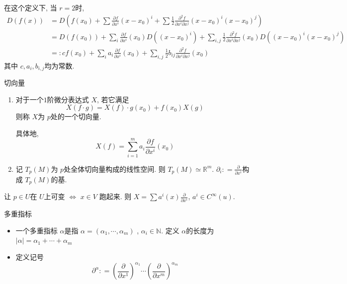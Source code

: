 \documentclass[../main.tex]{subfiles}
\begin{document}
    在这个定义下, 当 \(  r = 2 \)时, \[
  \begin{aligned}
    D\left( f\left( x \right)  \right)&= D\left( f\left( x_0 \right)+ \sum   \frac{\partial f}{\partial x^{i}}\left( x-x_0 \right)^{i}+ \sum \frac{1 }{2 } \frac{\partial ^{2}f}{\partial x^{i}\partial x^{j}  } \left( x-x_0 \right)^{i}\left( x-x_0 \right)^{j}   \right)   \\ 
     &= D\left( f\left( x_0 \right)  \right)+  \sum _{i} \frac{\partial f}{\partial x^{i}}\left( x_0 \right)D\left( \left( x-x_0 \right)^{i}  \right) + \sum _{i,j}\frac{1 }{2 }\frac{\partial ^{2}f    }{\partial x^{i} \partial x^{j}}   \left( x_0 \right)D\left( \left( x-x_0 \right)^{i}\left( x-x_0 \right)^{j}   \right)  \\ 
      &=: c f\left( x_0 \right)+ \sum _{i}a_{i}\frac{\partial f}{\partial x^{i}}\left( x_0 \right)+   \sum _{i,j}\frac{1 }{2 }b_{ij}\frac{\partial ^{2}f}{\partial x^{i} \partial x^{j}}\left( x_0 \right)   
  \end{aligned}
    \]其中 \(  c,a_{i},b_{i,j}  \)均为常数. 

    \begin{definition}{切向量}{}
       \begin{enumerate}
        \item  对于一个\(  1  \)阶微分表达式 \(  X  \), 若它满足 \[
        X\left( f\cdot g \right) =  X\left( f \right)\cdot g\left( x_0 \right)+ f\left( x_0 \right)X\left( g \right)     
        \]则称 \(  X  \)为 \(  p  \)处的一个切向量.    

        具体地,  \[
        X\left( f \right)= \sum _{i= 1}^{m}a_{i}\frac{\partial f}{\partial x^{i}}\left( x_0 \right)  
        \]
        \item 记 \(  T_{p}\left( M \right)   \)为 \(  p  \)处全体切向量构成的线性空间. 则 \(  T_{p}\left( M \right)\simeq \mathbb{R} ^{m}   \).  \(   \partial _{i}: =  \frac{\partial }{\partial x^{i}}  \)构成 \(  T_{p}\left( M \right)   \)的基.      
       \end{enumerate}
       
    \end{definition}
   
    让 \(  p \in U  \)在 \(  U  \)上可变 \(  \iff   \) \(  x \in V  \) 跑起来.   则 \(  X =  \sum a^{i}\left( x \right)\frac{\partial }{\partial x^{i}}   \), \(  a^{i} \in C^{\infty}\left( u \right)   \).   
    
    \begin{definition}{多重指标}{}
      \begin{itemize}
        \item   一个多重指标 \(  \alpha   \)是指 \(  \alpha = \left( \alpha _1 ,\cdots  , \alpha _{m} \right)   \) , \(  \alpha _{i} \in \mathbb{N}   \). 定义 \(  \alpha   \)的长度为 \(  \left| \alpha  \right|= \alpha _1 + \cdots + \alpha _{m}   \)
        \item 定义记号 \[
         \partial ^{\alpha } : =  \left( \frac{\partial }{\partial x^{1}} \right) ^{\alpha _1 }\cdots \left( \frac{\partial }{\partial x^{m}} \right)^{\alpha _{m}} 
        \]
      \end{itemize}
           
    \end{definition}
    
\end{document}
